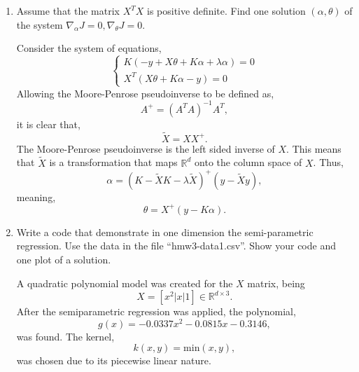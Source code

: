 \documentclass{article}[12pt]
\begin{document}
\begin{enumerate}
\item Assume that the matrix $X^TX$ is positive definite.
Find one solution $(\alpha,\theta)$ of the system  $\nabla_\alpha J=0, \nabla_\theta J=0$.  

Consider the system of equations,
\begin{equation}
\begin{cases}
K \left( -y + X \theta + K \alpha + \lambda \alpha \right) = 0 \\
X^T\left( X\theta + K\alpha -y\right) = 0
\end{cases}
\end{equation}
Allowing the Moore-Penrose pseudoinverse to be defined as,
\begin{equation}
A^+ = (A^T A)^{-1} A^T,
\end{equation}
it is clear that,
\begin{equation}
\tilde{X} = X X^+.
\end{equation}
The Moore-Penrose pseudoinverse is the left sided inverse of $X$. This means that $\tilde X$ is a transformation that maps $\mathbb R^d$ onto the column space of $X$. Thus,
\begin{equation}
\alpha = (K - \tilde{X} K - \lambda \tilde{X})^+ (y- \tilde{X} y),
\end{equation}
meaning,
\begin{equation}
\theta = X^+ (y - K \alpha).
\end{equation}



\item 
Write a code that demonstrate in one dimension the semi-parametric regression. Use the data in the file ``hmw3-data1.csv''. Show your code and one plot of a solution.  

A quadratic polynomial model was created for the $X$ matrix, being
\begin{equation}
X = [x^2 | x | 1] \in \mathbb R^{d \times 3}.
\end{equation}
After the semiparametric regression was applied, the polynomial,
\begin{equation}
g(x) = -0.0337 x^2 - 0.0815 x - 0.3146,
\end{equation}
was found. The kernel,
\begin{equation}
k(x,y) = \text{min}(x,y),
\end{equation}
was chosen due to its piecewise linear nature.


\end{enumerate}
\end{document}
